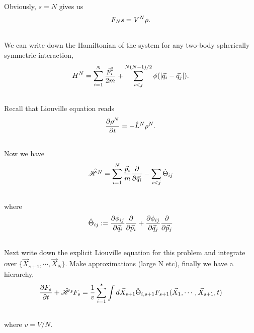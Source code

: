 \documentclass[letterpaper,10pt,english]{sphinxmanual}
\begin{document}
Obviously, $s=N$ gives us
\begin{gather}
\begin{split}F_Ns = V^N \rho  .\end{split}\notag\\\begin{split}\end{split}\notag
\end{gather}
We can write down the Hamiltonian of the system for any two-body spherically symmetric interaction,
\begin{gather}
\begin{split}H^N  =  \sum_{i=1}^N \frac{\vec p_i^2}{2m} + \sum_{i<j}^{N(N-1)/2} \phi(|\vec q_i - \vec q_j|) .\end{split}\notag\\\begin{split}\end{split}\notag
\end{gather}
Recall that Liouville equation reads
\begin{gather}
\begin{split}\frac{\partial \rho^N}{\partial t} = - \hat L^N \rho^N  .\end{split}\notag\\\begin{split}\end{split}\notag
\end{gather}
Now we have
\begin{gather}
\begin{split}\hat{\mathscr H^N} = \sum_{i=1}^N \frac{\vec p_i}{m}\frac{\partial}{\partial \vec q_i} - \sum_{i<j}\hat \Theta_{ij}\end{split}\notag\\\begin{split}\end{split}\notag
\end{gather}
where
\begin{gather}
\begin{split}\hat \Theta_{ij} := \frac{\partial \phi_{ij} }{\partial \vec q_i}\frac{\partial }{\partial \vec p_i} + \frac{\partial \phi_{ij}}{\partial \vec q_j} \frac{\partial}{\partial \vec p_j}\end{split}\notag\\\begin{split}\end{split}\notag
\end{gather}
Next write down the explicit Liouville equation for this problem and integrate over $\{ \vec X_{s+1}, \cdots, \vec X_N \}$. Make approximations (large N etc), finally we have a hierarchy,
\begin{gather}
\begin{split}\frac{\partial F_s}{\partial t} +  \hat{\mathscr H^s} F_s = \frac{1}{v}\sum_{i=1}^s\int d\vec X_{s+1} \hat \Theta_{i,s+1} F_{s+1}(\vec X_1,\cdots,\vec X_{s+1}, t)\end{split}\notag\\\begin{split}\end{split}\notag
\end{gather}
where $v=V/N$.
\end{document}
